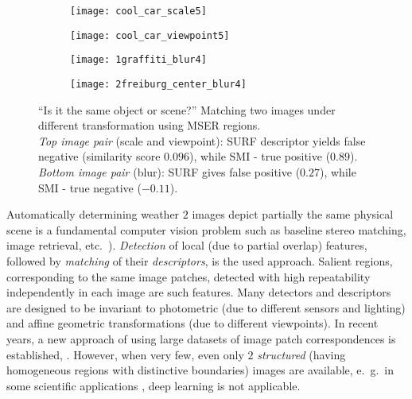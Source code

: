 \documentclass[a4paper,11pt]{article}
\begin{document}
\begin{wrapfigure}{r}{0.5\textwidth}
 \vspace{-22pt} 
\begin{center}
\begin{subfigure}[b]{0.22\textwidth}
  \texttt{[image: cool\_car\_scale5]}
\end{subfigure}
\begin{subfigure}[b]{0.22\textwidth}
\texttt{[image: cool\_car\_viewpoint5]}
\end{subfigure}
\end{center}
\vspace{-22pt}
\begin{center}
\begin{subfigure}[b]{0.22\textwidth}
  \texttt{[image: 1graffiti\_blur4]}
\end{subfigure}
\begin{subfigure}[b]{0.22\textwidth}
\texttt{[image: 2freiburg\_center\_blur4]}
\end{subfigure}
\end{center}
\vspace{-20pt}
\caption{\small ``Is it the same object or scene?'' Matching two images under different transformation using MSER regions.\\ {\em Top image pair} (scale and viewpoint): SURF descriptor yields false negative (similarity score $0.096$), while SMI - true positive ($0.89$).
{\em Bottom image pair} (blur): SURF gives false positive ($0.27$), while SMI - true negative ($-0.11$).}
\label{fig:intro1}
  \vspace{-16pt}
\end{wrapfigure}

Automatically determining weather $2$ images depict partially the same physical scene is a fundamental computer vision problem such as baseline stereo matching, image retrieval, etc.~\cite{EscaleraCVPR07,Matas2002BMVC}). {\em Detection} of local (due to partial overlap) features, followed by {\em matching} of their {\em descriptors}, is the used approach. Salient regions, corresponding to the same image patches, detected with high repeatability independently in each image are such features. Many detectors and descriptors are designed to be invariant to photometric (due to different sensors and lighting) and affine geometric transformations (due to different viewpoints). In recent years, a new approach of using large datasets of image patch correspondences is established, \cite{Snavely2008, ZagoruykoK15}. However, when very few, even only $2$ {\em structured} (having homogeneous regions with distinctive boundaries) images are available, e.~g.~in some scientific applications \cite{Ranguelova2016AICCSA}, deep learning is not applicable.
\end{document}
